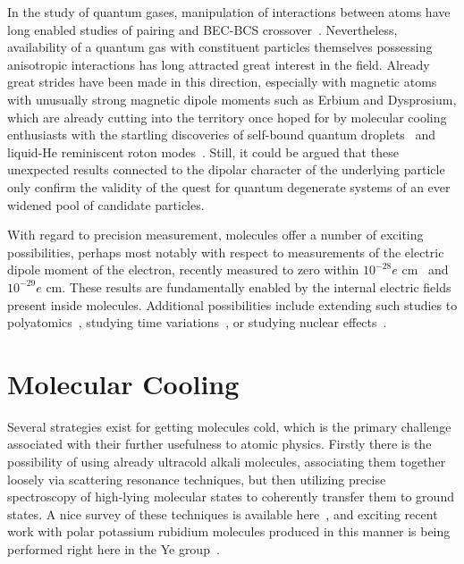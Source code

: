 In the study of quantum gases, manipulation of interactions between atoms have long enabled studies of pairing and BEC-BCS crossover~\cite{Zwierlein2003}.
Nevertheless, availability of a quantum gas with constituent particles themselves possessing anisotropic interactions has long attracted great interest in the field.
Already great strides have been made in this direction, especially with magnetic atoms with unusually strong magnetic dipole moments such as Erbium and Dysprosium, which are already cutting into the territory once hoped for by molecular cooling enthusiasts with the startling discoveries of self-bound quantum droplets~\cite{Schmitt2016} and liquid-He reminiscent roton modes~\cite{Chomaz2018}.
Still, it could be argued that these unexpected results connected to the dipolar character of the underlying particle only confirm the validity of the quest for quantum degenerate systems of an ever widened pool of candidate particles.

With regard to precision measurement, molecules offer a number of exciting possibilities, perhaps most notably with respect to measurements of the electric dipole moment of the electron, recently measured to zero within $10^{-28} e\text{ cm}$~\cite{Cairncross2017} and $10^{-29} e\text{ cm}$\cite{Andreev2018}.
These results are fundamentally enabled by the internal electric fields present inside molecules.
Additional possibilities include extending such studies to polyatomics~\cite{Kozyryev2017}, studying time variations~\cite{Zelevinsky2008}, or studying nuclear effects~\cite{DeMille2008}.





\section{Molecular Cooling}

Several strategies exist for getting molecules cold, which is the primary challenge associated with their further usefulness to atomic physics.
Firstly there is the possibility of using already ultracold alkali molecules, associating them together loosely via scattering resonance techniques, but then utilizing precise spectroscopy of high-lying molecular states to coherently transfer them to ground states.
A nice survey of these techniques is available here~\citep[Sec.~1.3]{HudsonThesis2006}, and exciting recent work with polar potassium rubidium molecules produced in this manner is being performed right here in the Ye group~\cite{DeMarco2019}.

